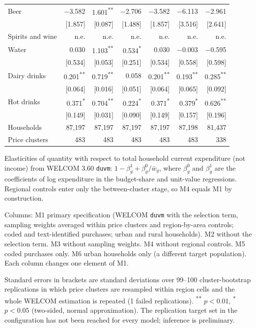 \documentclass[
  11pt,
]{article}
\begin{document}
\begin{table}[!htbp]
\begin{threeparttable}
\begin{tabular}{lrrrrrr}
Beer & $-$3.582 & 1.601\textsuperscript{**} & $-$2.706 & $-$3.582 & $-$6.113 & $-$2.961 \\
 & [1.857] & [0.087] & [1.488] & [1.857] & [3.516] & [2.641] \\
Spirits and wine & n.e. & n.e. & n.e. & n.e. & n.e. & n.e. \\
Water & 0.030 & 1.103\textsuperscript{**} & 0.534\textsuperscript{*} & 0.030 & $-$0.003 & $-$0.595 \\
 & [0.534] & [0.053] & [0.251] & [0.534] & [0.558] & [0.598] \\
Dairy drinks & 0.201\textsuperscript{**} & 0.719\textsuperscript{**} & 0.058 & 0.201\textsuperscript{**} & 0.193\textsuperscript{**} & 0.285\textsuperscript{**} \\
 & [0.064] & [0.016] & [0.051] & [0.064] & [0.065] & [0.092] \\
Hot drinks & 0.371\textsuperscript{*} & 0.704\textsuperscript{**} & 0.224\textsuperscript{*} & 0.371\textsuperscript{*} & 0.379\textsuperscript{*} & 0.626\textsuperscript{**} \\
 & [0.149] & [0.031] & [0.090] & [0.149] & [0.157] & [0.196] \\
\addlinespace
Households & 87,197 & 87,197 & 87,197 & 87,197 & 87,198 & 81,437 \\
Price clusters & 483 & 483 & 483 & 483 & 483 & 338 \\
\bottomrule
\end{tabular}
\begin{tablenotes}[flushleft]
\footnotesize
\item Elasticities of quantity with respect to total household current expenditure (not income) from WELCOM 3.60 \texttt{duvm}: $1-\beta^1_g+\beta^0_g/\bar w_g$, where $\beta^0_g$ and $\beta^1_g$ are the coefficients of log expenditure in the budget-share and unit-value regressions. Regional controls enter only the between-cluster stage, so M4 equals M1 by construction.
\item Columns: M1 primary specification (WELCOM \texttt{duvm} with the selection term, sampling weights averaged within price clusters and region-by-area controls; coded and text-identified purchases; urban and rural households). M2 without the selection term. M3 without sampling weights. M4 without regional controls. M5 coded purchases only. M6 urban households only (a different target population). Each column changes one element of M1.
\item Standard errors in brackets are standard deviations over 99--100 cluster-bootstrap replications in which price clusters are resampled within region cells and the whole WELCOM estimation is repeated (1 failed replications). \textsuperscript{**} $p<0.01$, \textsuperscript{*} $p<0.05$ (two-sided, normal approximation). The replication target set in the configuration has not been reached for every model; inference is preliminary.

\end{tablenotes}
\end{threeparttable}
\end{table}
\end{document}
